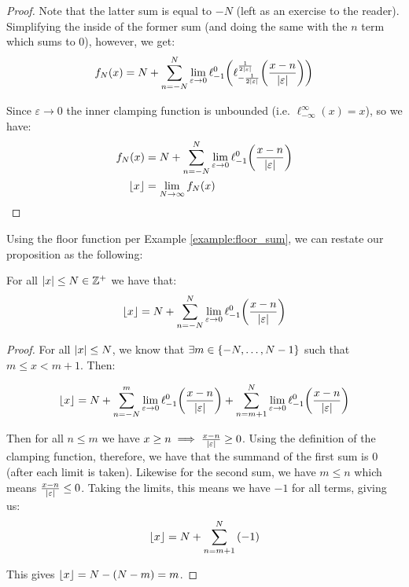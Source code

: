 \begin{example}
\begin{proof}
        Note that the latter sum is equal to $-N$ (left as an exercise to the reader). Simplifying the inside of the former sum (and doing the same with the $n$ term which sums to $0$), however, we get:
        $$
            f_N(x) = N+\sum_{n=-N}^{N}{\lim_{\varepsilon\to0}{\ell_{-1}^{0}\paren*{\ell_{-\frac{1}{2\abs{\varepsilon}}}^{\frac{1}{2\abs{\varepsilon}}}\paren*{\frac{x-n}{\abs{\varepsilon}}}}}}
        $$

        Since $\varepsilon\to 0$ the inner clamping function is unbounded (i.e. $\ell_{-\infty}^{\infty}(x)=x$), so we have:
        \begin{align*}
            f_N(x) &= N+\sum_{n=-N}^{N}{\lim_{\varepsilon\to0}{\ell_{-1}^{0}\paren*{\frac{x-n}{\abs{\varepsilon}}}}}\\
            \floor{x} &= \lim_{N\to\infty}{f_N(x)}
        \end{align*}
    \end{proof}
\end{example}

\begin{theorem}
    Using the floor function per Example \ref{example:floor_sum}, we can restate our proposition as the following:

    For all $\abs{x}\leq N\in\mathbb{Z}^+$ we have that:
    $$
        \floor{x} = N+\sum_{n=-N}^{N}{\lim_{\varepsilon\to0}{\ell_{-1}^{0}\paren*{\frac{x-n}{\abs{\varepsilon}}}}}
    $$

    \begin{proof}
        For all $\abs{x}\leq N$, we know that $\exists m\in\{-N,\dots,N-1\}$ such that $m\leq x< m+1$. Then:

        $$
            \floor{x} = N+\sum_{n=-N}^{m}{\lim_{\varepsilon\to0}{\ell_{-1}^{0}\paren*{\frac{x-n}{\abs{\varepsilon}}}}}+\sum_{n=m+1}^{N}{\lim_{\varepsilon\to0}{\ell_{-1}^{0}\paren*{\frac{x-n}{\abs{\varepsilon}}}}}
        $$

        Then for all $n\leq m$ we have $x\geq n\implies\frac{x-n}{\abs{\varepsilon}}\geq 0$. Using the definition of the clamping function, therefore, we have that the summand of the first sum is 0 (after each limit is taken). Likewise for the second sum, we have $m\leq n$ which means $\frac{x-n}{\abs{\varepsilon}}\leq 0$. Taking the limits, this means we have $-1$ for all terms, giving us:
        $$
            \lfloor x\rfloor = N+\sum_{n=m+1}^{N}{(-1)}
        $$

        This gives $\lfloor x\rfloor=N-(N-m)=m$.
    \end{proof}
\end{theorem}

\newpage